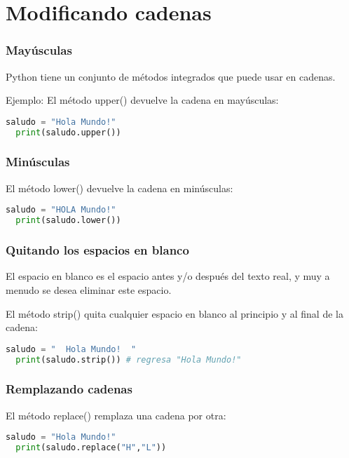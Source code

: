 \section{Modificando cadenas}

\begin{frame}[fragile]
  \frametitle{Mayúsculas}

  Python tiene un conjunto de métodos integrados que puede usar en cadenas.

  \vspace{\baselineskip}
  Ejemplo: El método \textcolor{codeKeyword}{upper}() devuelve la
  cadena en mayúsculas:
  \begin{lstlisting}[language=Python]
  saludo = "Hola Mundo!"
  print(saludo.upper())
  \end{lstlisting}
\end{frame}

\begin{frame}[fragile]
  \frametitle{Minúsculas}

  El método \textcolor{codeKeyword}{lower}() devuelve la
  cadena en minúsculas:

  \begin{lstlisting}[language=Python]
  saludo = "HOLA Mundo!"
  print(saludo.lower())
  \end{lstlisting}
\end{frame}

\begin{frame}[fragile]
  \frametitle{Quitando los espacios en blanco}

  El espacio en blanco es el espacio antes y/o después del texto real,
  y muy a menudo se desea eliminar este espacio.

  \vspace{\baselineskip}
  El método \textcolor{codeKeyword}{strip}() quita cualquier espacio en
  blanco al principio y al final de la cadena:

  \begin{lstlisting}[language=Python]
  saludo = "  Hola Mundo!  "
  print(saludo.strip()) # regresa "Hola Mundo!"
  \end{lstlisting}
\end{frame}

\begin{frame}[fragile]
  \frametitle{Remplazando cadenas}

  El método \textcolor{codeKeyword}{replace}() remplaza una cadena por otra:

  \vspace{\baselineskip}
  \begin{lstlisting}[language=Python]
  saludo = "Hola Mundo!"
  print(saludo.replace("H","L"))
  \end{lstlisting}
\end{frame}

